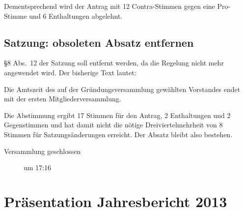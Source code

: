\documentclass[a4paper,12pt]{scrartcl}
\renewenvironment{quote}{%
  \list{}{\rightmargin\leftmargin}%
    \item\small\itshape\relax%
}{%
  \endlist
}
\begin{document}
Dementsprechend wird der Antrag mit 12 Contra-Stimmen gegen eine Pro-Stimme und
6 Enthaltungen abgelehnt.

\subsection{Satzung: obsoleten Absatz entfernen}

§8 Abs.~12 der Satzung soll entfernt werden, da die Regelung nicht mehr
angewendet wird. Der bisherige Text lautet:
\begin{quote}
  Die Amtszeit des auf der Gründungsversammlung gewählten Vorstandes endet mit
  der ersten Mitgliederversammlung.
\end{quote}

Die Abstimmung ergibt 17 Stimmen für den Antrag, 2 Enthaltungen und 2
Gegenstimmen und hat damit nicht die nötige Dreiviertelmehrheit von 8 Stimmen
für Satzungsänderungen erreicht. Der Absatz bleibt also bestehen.

\begin{description}
  \item[Versammlung geschlossen] um 17:16
\end{description}


\appendix

\cleardoublepage
\section{Präsentation Jahresbericht 2013}\label{sec:jahresbericht}


\end{document}
